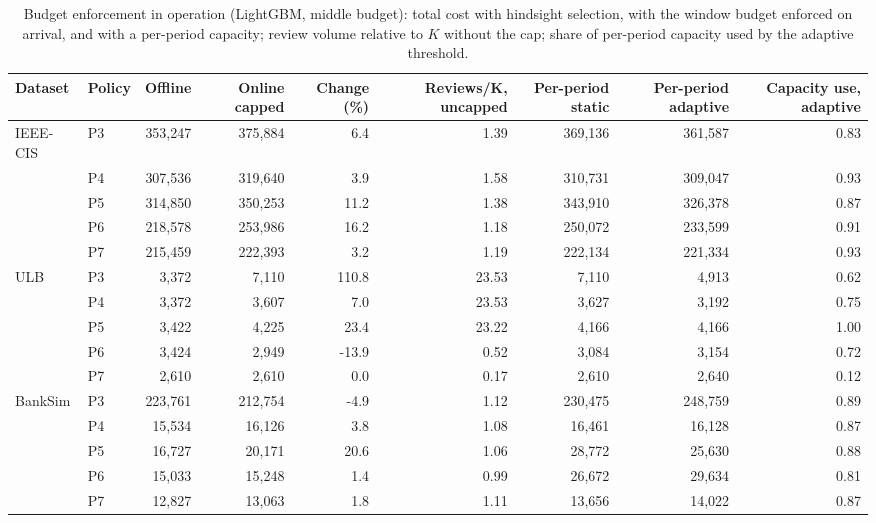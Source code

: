 \begin{table}[t]
\centering
\caption{Budget enforcement in operation (LightGBM, middle budget): total cost with hindsight selection, with the window budget enforced on arrival, and with a per-period capacity; review volume relative to $K$ without the cap; share of per-period capacity used by the adaptive threshold.}
\label{tab:operational}
\begin{tabular}{llrrrrrrr}
\toprule
Dataset & Policy & Offline & Online capped & Change (\%) & Reviews/K, uncapped & Per-period static & Per-period adaptive & Capacity use, adaptive \\
\midrule
IEEE-CIS & P3 & 353,247 & 375,884 & 6.4 & 1.39 & 369,136 & 361,587 & 0.83 \\
 & P4 & 307,536 & 319,640 & 3.9 & 1.58 & 310,731 & 309,047 & 0.93 \\
 & P5 & 314,850 & 350,253 & 11.2 & 1.38 & 343,910 & 326,378 & 0.87 \\
 & P6 & 218,578 & 253,986 & 16.2 & 1.18 & 250,072 & 233,599 & 0.91 \\
 & P7 & 215,459 & 222,393 & 3.2 & 1.19 & 222,134 & 221,334 & 0.93 \\
ULB & P3 & 3,372 & 7,110 & 110.8 & 23.53 & 7,110 & 4,913 & 0.62 \\
 & P4 & 3,372 & 3,607 & 7.0 & 23.53 & 3,627 & 3,192 & 0.75 \\
 & P5 & 3,422 & 4,225 & 23.4 & 23.22 & 4,166 & 4,166 & 1.00 \\
 & P6 & 3,424 & 2,949 & -13.9 & 0.52 & 3,084 & 3,154 & 0.72 \\
 & P7 & 2,610 & 2,610 & 0.0 & 0.17 & 2,610 & 2,640 & 0.12 \\
BankSim & P3 & 223,761 & 212,754 & -4.9 & 1.12 & 230,475 & 248,759 & 0.89 \\
 & P4 & 15,534 & 16,126 & 3.8 & 1.08 & 16,461 & 16,128 & 0.87 \\
 & P5 & 16,727 & 20,171 & 20.6 & 1.06 & 28,772 & 25,630 & 0.88 \\
 & P6 & 15,033 & 15,248 & 1.4 & 0.99 & 26,672 & 29,634 & 0.81 \\
 & P7 & 12,827 & 13,063 & 1.8 & 1.11 & 13,656 & 14,022 & 0.87 \\
\bottomrule
\end{tabular}
\end{table}
